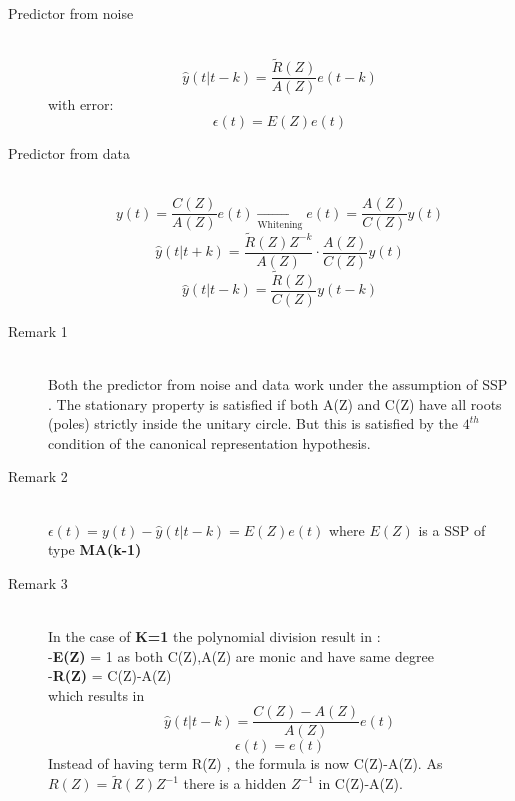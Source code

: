 \begin{description}
\item[Predictor from noise]\hfill\\
\[
\boxed{\hat{y}(t|t-k) = \frac{\tilde{R}(Z)}{A(Z)}e(t-k)}
\]
with error:
\[
\boxed{\epsilon(t) = E(Z)e(t)}
\]
\item[Predictor from data]\hfill\\
$$ y(t) =\frac{C(Z)}{A(Z)}e(t) \xrightarrow[\text{Whitening}]{}e(t) = \frac{A(Z)}{C(Z)}y(t)$$
$$ \hat{y}(t|t+k) = \frac{\tilde{R}(Z)Z^{-k}}{A(Z)} \cdot \frac{A(Z)}{C(Z)}y(t)$$
\[
\boxed{\hat{y}(t|t-k) = \frac{\tilde{R}(Z)}{C(Z)}y(t-k)}
\]
\item[Remark 1]\hfill\\
Both the predictor from noise and data work under the assumption of SSP . The stationary property is satisfied if both A(Z) and C(Z) have all roots (poles) strictly inside the unitary circle. But this is satisfied by the $4^{th}$ condition of the canonical representation hypothesis.
\item[Remark 2]\hfill\\
$\epsilon(t) = y(t)- \hat{y}(t|t-k)=E(Z)e(t)$ where $E(Z)$ is a SSP of type \textbf{MA(k-1)}
\item[Remark 3]\hfill\\
In the case of \textbf{K=1} the polynomial division result in :\\
-\textbf{E(Z)} = 1 as both C(Z),A(Z) are monic and have same degree\\
-\textbf{R(Z)} = C(Z)-A(Z)\\
which results in 
\[
\boxed{\hat{y}(t|t-k)=\frac{C(Z)-A(Z)}{A(Z)}e(t)}
\]
\[
\boxed{\epsilon(t)=e(t)}
\]
Instead of having term R(Z) , the formula is now C(Z)-A(Z). As $R(Z)= \tilde{R}(Z)Z^{-1}$ there is a hidden $Z^{-1}$ in C(Z)-A(Z).
\end{description}

